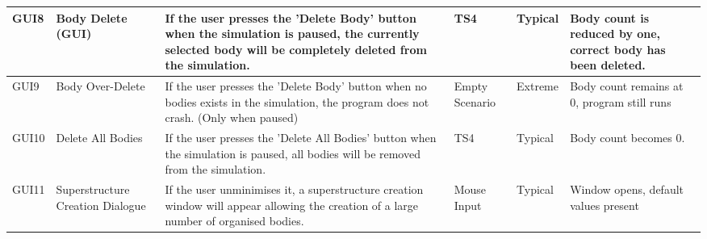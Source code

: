 \begin{sidewaystable}
\begin{tabular}{|M{0.8cm}|P{3cm}|P{7.5cm}|P{2cm}|P{1.5cm}|P{4cm}|}
GUI8 & Body Delete (GUI) & If the user presses the 'Delete Body' button when the simulation is paused, the currently selected body will be completely deleted from the simulation. & TS4 & Typical & Body count is reduced by one, correct body has been deleted. \\ \hline
GUI9 & Body Over-Delete & If the user presses the 'Delete Body' button when no bodies exists in the simulation, the program does not crash. (Only when paused) & Empty Scenario & Extreme & Body count remains at 0, program still runs \\ \hline
GUI10 & Delete All Bodies & If the user presses the 'Delete All Bodies' button when the simulation is paused, all bodies will be removed from the simulation. & TS4 & Typical & Body count becomes 0. \\ \hline
GUI11 & Superstructure Creation Dialogue & If the user unminimises it, a superstructure creation window will appear allowing the creation of a large number of organised bodies. & Mouse Input & Typical & Window opens, default values present\\
\hline
\end{tabular}
\end{sidewaystable}
